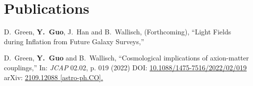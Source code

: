 \documentclass[letterpaper,12pt]{article}
\begin{document}
\section{Publications}

D.~Green, \textbf{Y.~Guo}, J.~Han and B.~Wallisch, (Forthcoming),
``Light Fields during Inflation from Future Galaxy Surveys,''

D.~Green, \textbf{Y.~Guo} and B.~Wallisch,
``Cosmological implications of axion-matter couplings,''
In: \textit{JCAP} 02.02, p. 019 (2022)
DOI: \href{https://iopscience.iop.org/article/10.1088/1475-7516/2022/02/019}{10.1088/1475-7516/2022/02/019}
arXiv: \href{https://arxiv.org/abs/2109.12088?context=hep-ph}{2109.12088 [astro-ph.CO].}
\end{document}
